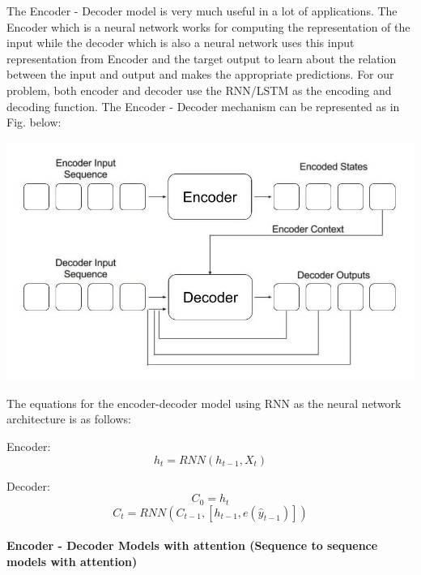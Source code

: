 The Encoder - Decoder model \cite{12} is very much useful in a lot of applications. The Encoder which is a neural network works for computing the representation of the input while the decoder which is also a neural network uses this input representation from Encoder and the target output to learn about the relation between the input and output and makes the appropriate predictions. For our problem, both encoder and decoder use the RNN/LSTM as the encoding and decoding function. The Encoder - Decoder mechanism can be represented as in Fig. below:

				\begin{center}
				\includegraphics[width=\linewidth]{figures/Sequence-to-Sequence-Model.jpg}	
				\label{fig: Encoder - Decoder Mechanism}
				\end{center}

The equations for the encoder-decoder model using RNN as the neural network architecture is as follows:
 
Encoder: \begin{equation} h_{t} = RNN(h_{t-1}, X_{t}) \end{equation}

Decoder: \begin{equation} C_{0} = h_{t}  \end{equation}	
		 \begin{equation} C_{t} = RNN(C_{t-1}, [h_{t-1}, e(\hat{y}_{t-1})])  \end{equation}


\paragraph{Encoder - Decoder Models with attention (Sequence to sequence models with attention)}

